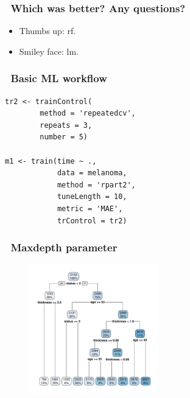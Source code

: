 \documentclass[handout, aspectratio = 169]{beamer}
\begin{document}
\begin{frame}
\frametitle{\insertframenumber~Which was better? Any questions?}

\begin{itemize}
\item Thumbs up: rf.
\item Smiley face: lm.
\end{itemize}
\end{frame} 







\begin{frame}[fragile]
\frametitle{\insertframenumber~Basic ML workflow}
\begin{Verbatim}
tr2 <- trainControl(
        method = 'repeatedcv',
        repeats = 3,
        number = 5)

m1 <- train(time ~ ., 
            data = melanoma,
            method = 'rpart2',
            tuneLength = 10,
            metric = 'MAE',
            trControl = tr2)

\end{Verbatim}

\end{frame} 





\begin{frame}
\frametitle{\insertframenumber~Maxdepth parameter}
\vspace{-4mm}
\begin{figure}
    \includegraphics[width = 0.5\textwidth]{rpart_depth6.pdf}
\end{figure} 

\end{frame} 
\end{document}
